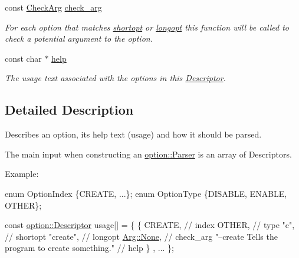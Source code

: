 \begin{DoxyCompactItemize}
const \hyperlink{namespaceoption_a4cdf403efae65e18bf850e2001b12a2a}{Check\+Arg} \hyperlink{structoption_1_1Descriptor_aa5d675dba0214a4abd73007ff163cc67}{check\+\_\+arg}
\begin{DoxyCompactList}\small\item\em For each option that matches \hyperlink{structoption_1_1Descriptor_a0dba4ccca59c19d6ed4081391fca5adb}{shortopt} or \hyperlink{structoption_1_1Descriptor_a470c449dfa894c9bfda2dae026142b4b}{longopt} this function will be called to check a potential argument to the option. \end{DoxyCompactList}\item 
const char $\ast$ \hyperlink{structoption_1_1Descriptor_a9045b19311533e1b8a08645d57149c79}{help}
\begin{DoxyCompactList}\small\item\em The usage text associated with the options in this \hyperlink{structoption_1_1Descriptor}{Descriptor}. \end{DoxyCompactList}\end{DoxyCompactItemize}


\subsection{Detailed Description}
Describes an option, its help text (usage) and how it should be parsed. 

The main input when constructing an \hyperlink{classoption_1_1Parser}{option\+::\+Parser} is an array of Descriptors.

\begin{DoxyParagraph}{Example\+:}

\begin{DoxyCode}
\textcolor{keyword}{enum} OptionIndex \{CREATE, ...\};
\textcolor{keyword}{enum} OptionType \{DISABLE, ENABLE, OTHER\};

\textcolor{keyword}{const} \hyperlink{structoption_1_1Descriptor}{option::Descriptor} usage[] = \{
  \{ CREATE,                                            \textcolor{comment}{// index}
    OTHER,                                             \textcolor{comment}{// type}
    \textcolor{stringliteral}{"c"},                                               \textcolor{comment}{// shortopt}
    \textcolor{stringliteral}{"create"},                                          \textcolor{comment}{// longopt}
    \hyperlink{structoption_1_1Arg_a7fc01987899c91c6b6a1be5711a46e22}{Arg::None},                                         \textcolor{comment}{// check\_arg}
    \textcolor{stringliteral}{"--create  Tells the program to create something."} \textcolor{comment}{// help}
  \}
  , ...
\};
\end{DoxyCode}
 
\end{DoxyParagraph}


